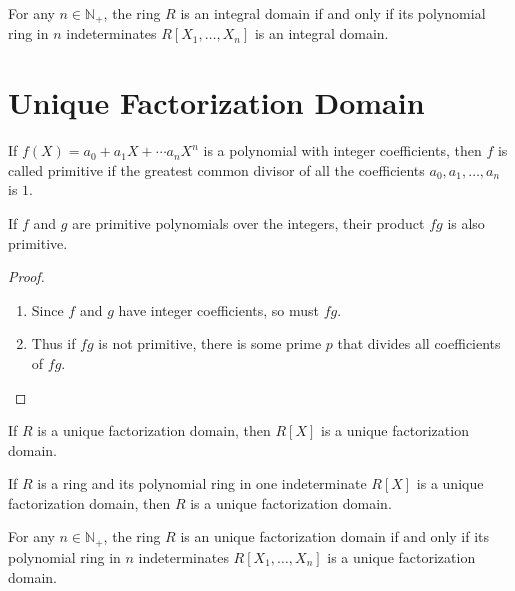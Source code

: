 \begin{corollary}
    For any \(n \in \mathbb{N}_+\), the ring \(R\) is an integral domain if and only if its polynomial ring in \(n\) indeterminates \(R[X_1, \ldots, X_n]\) is an integral domain.
\end{corollary}

\newpage
\chapter{Unique Factorization Domain}

\begin{defbox}
    \begin{definition}
        If \(f(X) = a_0 + a_1 X + \cdots a_n X^n\) is a polynomial with integer coefficients, then \(f\) is called primitive if the greatest common divisor of all the coefficients \(a_0, a_1, \ldots, a_n\) is \(1\).
    \end{definition}
\end{defbox}

\begin{lemma}
    If \(f\) and \(g\) are primitive polynomials over the integers, their product \(fg\) is also primitive.
\end{lemma}

\begin{proof}
    \begin{enumerate}
        \item Since \(f\) and \(g\) have integer coefficients, so must \(fg\).
        \item Thus if \(fg\) is not primitive, there is some prime \(p\) that divides all coefficients of \(fg\).
    \end{enumerate}
\end{proof}

\begin{proposition}
    If \(R\) is a unique factorization domain, then \(R[X]\) is a unique factorization domain.
\end{proposition}

\begin{proposition}
    If \(R\) is a ring and its polynomial ring in one indeterminate \(R[X]\) is a unique factorization domain, then \(R\) is a unique factorization domain.
\end{proposition}

\begin{corollary}
    For any \(n \in \mathbb{N}_+\), the ring \(R\) is an unique factorization domain if and only if its polynomial ring in \(n\) indeterminates \(R[X_1, \ldots, X_n]\) is a unique factorization domain.
\end{corollary}
